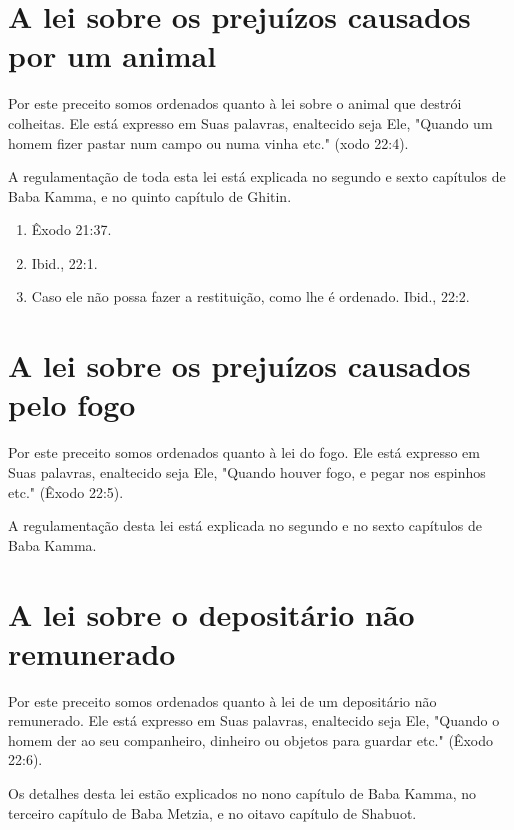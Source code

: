 \section{A lei sobre os prejuízos causados por um animal}

Por este preceito somos ordenados quanto à lei sobre o animal que
destrói colheitas. Ele está expresso em Suas palavras, enaltecido seja
Ele, "Quan­do um homem fizer pastar num campo ou numa vinha etc." (xodo
22:4).

A regulamentação de toda esta lei está explicada no segundo e sexto
capítulos de Baba Kamma, e no quinto capítulo de Ghitin.


\begin{enumerate}
\def\labelenumi{\arabic{enumi}.}
\setcounter{enumi}{224}
\item
 
 Êxodo 21:37.
 
\item
 
 Ibid., 22:1.
 
\item
 
 Caso ele não possa fazer a restituição, como lhe é ordenado. Ibid.,
 22:2.
 
\end{enumerate}




\section{A lei sobre os prejuízos causados pelo fogo}

Por este preceito somos ordenados quanto à lei do fogo. Ele está
ex­presso em Suas palavras, enaltecido seja Ele, "Quando houver fogo, e
pegar nos espinhos etc." (Êxodo 22:5).

A regulamentação desta lei está explicada no segundo e no sexto
ca­pítulos de Baba Kamma.

\section{A lei sobre o depositário não remunerado}

Por este preceito somos ordenados quanto à lei de um depositário não
remunerado. Ele está expresso em Suas palavras, enaltecido seja Ele,
"Quando o homem der ao seu companheiro, dinheiro ou objetos para
guar­dar etc." (Êxodo 22:6).

Os detalhes desta lei estão explicados no nono capítulo de Baba Kam­ma,
no terceiro capítulo de Baba Metzia, e no oitavo capítulo de Shabuot.

